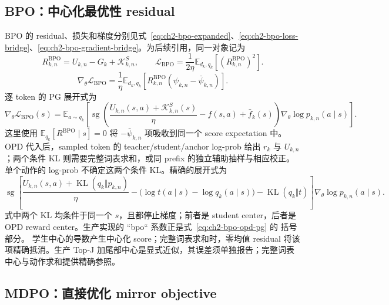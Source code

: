 \subsection{BPO：中心化最优性 residual}
\label{sec:ch2-bpo}

BPO 的 residual、损失和梯度分别见式~\eqref{eq:ch2-bpo-expanded}、\eqref{eq:ch2-bpo-loss-bridge}、\eqref{eq:ch2-bpo-gradient-bridge}。为后续引用，同一对象记为
\begin{equation}
R_{k,n}^{\mathrm{BPO}}=U_{k,n}-G_k+\mathcal K_{k,n}^{S},\qquad
\mathcal L_{\mathrm{BPO}}=\frac1{2\eta}\mathbb E_{d_k, q_k}[(R_{k,n}^{\mathrm{BPO}})^2].
\label{eq:ch2-bpo-residual}
\end{equation}
\begin{equation}
\nabla_\theta\mathcal L_{\mathrm{BPO}}
=\frac1\eta\mathbb E_{d_k, q_k}[R_{k,n}^{\mathrm{BPO}}(\psi_{k,n}-\bar\psi_{k,n})].
\label{eq:ch2-bpo-gradient}
\end{equation}
逐 token 的 PG 展开式为
\begin{equation}
\label{eq:ch2-bpo-pg}
\nabla_\theta\mathcal L_{\mathrm{BPO}}(s)
=\mathbb E_{a\sim q_k}\left[
\operatorname{sg}\!\left(\frac{U_{k,n}(s,a)+\mathcal K_{k,n}^{S}(s)}\eta-f(s,a)+\bar f_k(s)\right)
\nabla_\theta\log p_{k,n}(a\mid s)\right].
\end{equation}
这里使用 $\mathbb E_{ q_k}[R^{\mathrm{BPO}}\mid s]=0$ 将
$-\bar\psi_{k,n}$ 项吸收到同一个 score expectation 中。OPD 代入后，sampled token 的 teacher/student/anchor log-prob 给出 $r_k$ 与 $U_{k,n}$；两个条件 KL 则需要完整词表求和，或同 prefix 的独立辅助抽样与相应校正。单个动作的 log-prob 不确定这两个条件 KL。精确的展开式为
\begin{equation}
\label{eq:ch2-bpo-opd-pg}
\operatorname{sg}\!\left[
\frac{U_{k,n}(s,a)+\operatorname{KL}( q_k\Vert p_{k,n})}{\eta}
-\bigl(\log t(a\mid s)-\log q_k(a\mid s)\bigr)
-\operatorname{KL}( q_k\Vert t)
\right]\nabla_\theta\log p_{k,n}(a\mid s).
\end{equation}
式中两个 KL 均条件于同一个 $s$，且都停止梯度；前者是 student center，后者是
OPD reward center。生产实现的 ``bpo`` 系数正是式~\eqref{eq:ch2-bpo-opd-pg} 的
括号部分。
学生中心的导数产生中心化 score；完整词表求和时，零均值 residual 将该项精确抵消。生产 Top-J 加尾部中心是显式近似，其误差须单独报告；完整词表中心与动作求和提供精确参照。

\subsection{MDPO：直接优化 mirror objective}
\label{sec:ch2-mdpo-generic}

